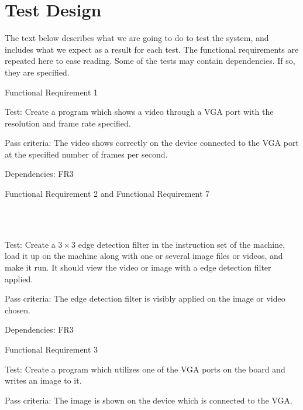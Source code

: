 \section{Test Design}

The text below describes what we are going to do to test the system, and
includes what we expect as a result for each test. The functional requirements
are repeated here to ease reading. Some of the tests may contain
dependencies\footnotemark. If so, they are specified.


{\sc Functional Requirement 1}
\begin{Test}
  {\em \FRI}

  {\sc Test:} Create a program which shows a video through a \ac{VGA} port with
  the resolution and frame rate specified.

  {\sc Pass criteria:} The video shows correctly on the device connected to the
  \ac{VGA} port at the specified number of frames per second.
  
  {\sc Dependencies:} FR3
\end{Test}

{\sc Functional Requirement 2 and Functional Requirement 7}
\begin{Test}
  {\em \FRII}\\\\
  {\em \FRVII}
  
  {\sc Test:} Create a $3\times3$ edge detection filter in the instruction set
  of the machine, load it up on the machine along with one or several image
  files or videos, and make it run. It should view the video or image with a
  edge detection filter applied.

  {\sc Pass criteria:} The edge detection filter is visibly applied on the
  image or video chosen.

  {\sc Dependencies:} FR3
\end{Test}

{\sc Functional Requirement 3}
\begin{Test}
  {\em \FRIII}
  
  {\sc Test:} Create a program which utilizes one of the \ac{VGA} ports on the
  board and writes an image to it.

  {\sc Pass criteria:} The image is shown on the device which is connected to
  the \ac{VGA}.
\end{Test}

